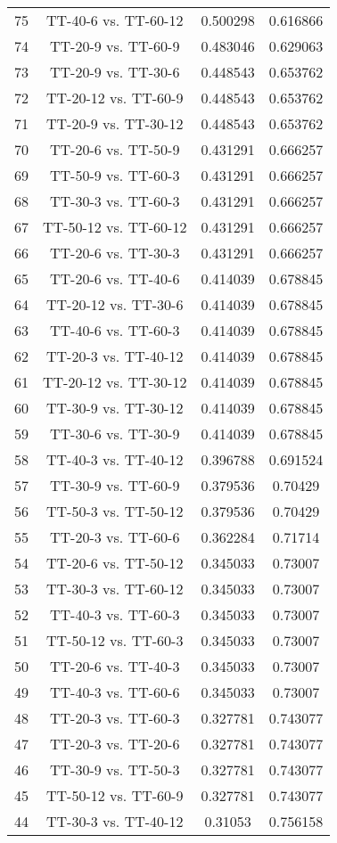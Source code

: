 \documentclass[a4paper,10pt]{article}
\begin{document}
\begin{landscape}
\begin{table}[!htp]
\begin{tabular}{cccc}
75&TT-40-6 vs. TT-60-12&0.500298&0.616866\\
74&TT-20-9 vs. TT-60-9&0.483046&0.629063\\
73&TT-20-9 vs. TT-30-6&0.448543&0.653762\\
72&TT-20-12 vs. TT-60-9&0.448543&0.653762\\
71&TT-20-9 vs. TT-30-12&0.448543&0.653762\\
70&TT-20-6 vs. TT-50-9&0.431291&0.666257\\
69&TT-50-9 vs. TT-60-3&0.431291&0.666257\\
68&TT-30-3 vs. TT-60-3&0.431291&0.666257\\
67&TT-50-12 vs. TT-60-12&0.431291&0.666257\\
66&TT-20-6 vs. TT-30-3&0.431291&0.666257\\
65&TT-20-6 vs. TT-40-6&0.414039&0.678845\\
64&TT-20-12 vs. TT-30-6&0.414039&0.678845\\
63&TT-40-6 vs. TT-60-3&0.414039&0.678845\\
62&TT-20-3 vs. TT-40-12&0.414039&0.678845\\
61&TT-20-12 vs. TT-30-12&0.414039&0.678845\\
60&TT-30-9 vs. TT-30-12&0.414039&0.678845\\
59&TT-30-6 vs. TT-30-9&0.414039&0.678845\\
58&TT-40-3 vs. TT-40-12&0.396788&0.691524\\
57&TT-30-9 vs. TT-60-9&0.379536&0.70429\\
56&TT-50-3 vs. TT-50-12&0.379536&0.70429\\
55&TT-20-3 vs. TT-60-6&0.362284&0.71714\\
54&TT-20-6 vs. TT-50-12&0.345033&0.73007\\
53&TT-30-3 vs. TT-60-12&0.345033&0.73007\\
52&TT-40-3 vs. TT-60-3&0.345033&0.73007\\
51&TT-50-12 vs. TT-60-3&0.345033&0.73007\\
50&TT-20-6 vs. TT-40-3&0.345033&0.73007\\
49&TT-40-3 vs. TT-60-6&0.345033&0.73007\\
48&TT-20-3 vs. TT-60-3&0.327781&0.743077\\
47&TT-20-3 vs. TT-20-6&0.327781&0.743077\\
46&TT-30-9 vs. TT-50-3&0.327781&0.743077\\
45&TT-50-12 vs. TT-60-9&0.327781&0.743077\\
44&TT-30-3 vs. TT-40-12&0.31053&0.756158\\

\end{tabular}
\end{table}
\end{landscape}
\end{document}
